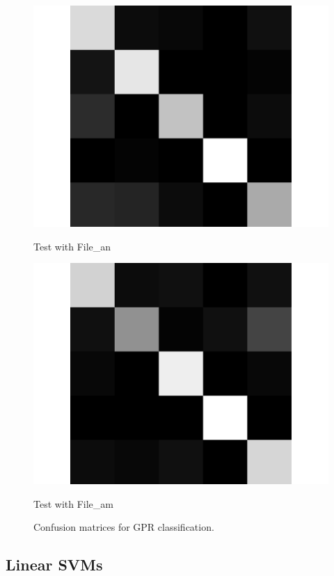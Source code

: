 \documentclass[letterpaper]{article}
\begin{document}
\begin{figure}
\begin{minipage}{.45\linewidth}
   \includegraphics[width=\linewidth]{confusionmatrices/gpr_train_am_test_an.png}
   \small\centerline{Test with File\_an}\normalsize
   \end{minipage}
\begin{minipage}{.45\linewidth}
   \includegraphics[width=\linewidth]{confusionmatrices/gpr_train_an_test_am.png}
   \small\centerline{Test with File\_am}\normalsize
   \end{minipage}
   \caption{Confusion matrices for GPR classification.}
\end{figure}

\subsection*{Linear SVMs}
\end{document}
